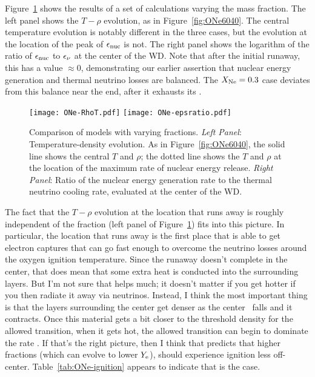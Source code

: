 \documentclass[modern]{aastex62}
\begin{document}

Figure~\ref{fig:ONe-vary} shows the results of a set of calculations
varying the \neon[20] mass fraction.  The left panel shows the
$T-\rho$ evolution, as in Figure~\ref{fig:ONe6040}.  The central
temperature evolution is notably different in the three cases, but the
evolution at the location of the peak of $\epsilon_{\mathrm{nuc}}$ is not.  The right
panel shows the logarithm of the ratio of $\epsilon_{\mathrm{nuc}}$ to $\epsilon_{\nu}$ at the
center of the WD.  Note that after the initial runaway, this has a
value $\approx 0$, demonstrating our earlier assertion that nuclear
energy generation and thermal neutrino losses are balanced.  The
$X_{\rm Ne} = 0.3$ case deviates from this balance near the end, after
it exhausts its \neon[20].

\begin{figure}
  \centering
  \texttt{[image: ONe-RhoT.pdf]}
  \texttt{[image: ONe-epsratio.pdf]}
  \caption{Comparison of models with varying \neon[20] fractions.
    \textit{Left Panel}: Temperature-density evolution.  As in
    Figure~\ref{fig:ONe6040}, the solid line shows the central $T$ and
    $\rho$; the dotted line shows the $T$ and $\rho$ at the location
    of the maximum rate of nuclear energy release.  \textit{Right
      Panel}: Ratio of the nuclear energy generation rate to the
    thermal neutrino cooling rate, evaluated at the center of the WD.}
  \label{fig:ONe-vary}
\end{figure}


The fact that the $T-\rho$ evolution at the location that runs away is
roughly independent of the \neon[20] fraction (left panel of
Figure~\ref{fig:ONe-vary}) fits into this picture.  In particular, the
location that runs away is the first place that is able to get
electron captures that can go fast enough to overcome the neutrino
losses around the oxygen ignition temperature.  Since the runaway
doesn't complete in the center, that does mean that some extra heat is
conducted into the surrounding layers.  But I'm not sure that helps
much; it doesn't matter if you get hotter if you then radiate it away
via neutrinos.  Instead, I think the most important thing is that the
layers surrounding the center get denser as the center \Ye\ falls and
it contracts.  Once this material gets a bit closer to the threshold
density for the allowed transition, when it gets hot, the allowed
transition can begin to dominate the rate \citep[again, see Figure 1
in ][]{MartinezPinedo2014}.  If that's the right picture, then I think
that predicts that higher \neon[20] fractions (which can evolve to
lower $Y_{\rm e}$), should experience ignition less off-center.
Table~\ref{tab:ONe-ignition} appears to indicate that is the case.
\end{document}
